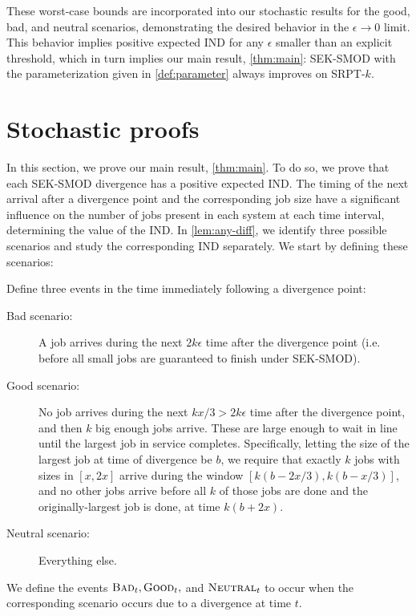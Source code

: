 \documentclass[acmsmall]{acmart}
\newcommand{\bad}{\textsc{Bad}}
\newcommand{\good}{\textsc{Good}}
\newcommand{\neutral}{\textsc{Neutral}}
\begin{document}
These worst-case bounds are incorporated into our stochastic results for the good, bad, and neutral scenarios, demonstrating the desired behavior in the $\epsilon \to 0$ limit. This behavior implies positive expected IND for any $\epsilon$ smaller than an explicit threshold, which in turn implies our main result, \cref{thm:main}: SEK-SMOD with the parameterization given in \cref{def:parameter} always improves on SRPT-$k$.


\section{Stochastic proofs}
\label{sec:stochastic}

In this section, we prove our main result, \cref{thm:main}.
To do so, we prove that each SEK-SMOD divergence has a positive expected IND. The timing of the next arrival after a divergence point and the corresponding job size have a significant influence on the number of jobs present in each system at each time interval, determining the value of the IND.  In \cref{lem:any-diff}, we identify three possible scenarios and study the corresponding IND separately. We start by defining these scenarios:
\begin{definition}\label{def:good-bad-neutral}
    Define three events in the time immediately following a divergence point:
    \begin{description}
        \item[Bad scenario:] A job arrives during the next $2k\epsilon$ time after the divergence point (i.e. before all small jobs are guaranteed to finish under SEK-SMOD).
        \item[Good scenario:] No job arrives during the next $kx/3 > 2k\epsilon$ time after the divergence point,
        and then $k$ big enough jobs arrive. These are large enough to wait in line until the largest job in service completes.
        Specifically, letting the size of the largest job at time of divergence be $b$, we require that exactly $k$ jobs with sizes in $[x, 2x]$ arrive during the window $[k(b-2x/3), k(b-x/3)]$, and no other jobs arrive before all $k$ of those jobs are done and the originally-largest job is done, at time $k(b+2x)$.
        \item[Neutral scenario:] Everything else.
    \end{description}
    We define the events $\bad_t, \good_t,$ and $\neutral_t$ to occur when the corresponding scenario occurs due to a divergence at time $t$.
\end{definition}
\end{document}
